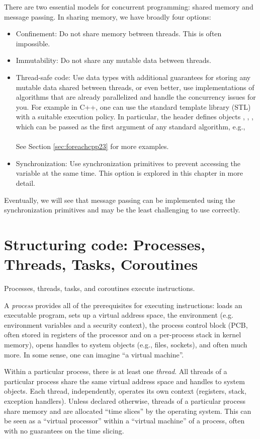 There are two essential models for concurrent programming: shared memory and message passing. In sharing memory, we have broadly four options:
\begin{itemize}
\item Confinement: Do not share memory between threads. This is often impossible.
\item Immutability: Do not share any mutable data between threads. 
\item Thread-safe code: Use data types with additional guarantees for storing any mutable data shared between threads, or even better, use implementations of algorithms that are already parallelized and handle the concurrency issues for you. For example in C++, one can use the standard template library (STL) with a suitable execution policy. In particular, the header  defines objects , , , which can be passed as the first argument of any standard algorithm, e.g., \\
\\
See Section \ref{sec:foreachcpp23} for more examples.
\item Synchronization: Use synchronization primitives to prevent accessing the variable at the same time. This option is explored in this chapter in more detail. 
\end{itemize}
Eventually, we will see that message passing can be implemented using the synchronization primitives and may be the least challenging to use correctly. 

\section{Structuring code: Processes, Threads, Tasks, Coroutines}

Processes, threads, tasks, and coroutines execute instructions. 

A \emph{process} provides all of the prerequisites for executing instructions: loads an executable program, sets up a virtual address space, the environment (e.g. environment variables and a security context), the process control block (PCB, often stored in registers of the processor and on a per-process stack in kernel memory), opens handles to system objects (e.g., files, sockets), and often much more. In some sense, one can imagine ``a virtual machine''.

Within a particular process, there is at least one \emph{thread}. All threads of a particular process share the same virtual address space and handles to system objects. Each thread, independently, operates its own context (registers, stack, exception handlers). Unless declared otherwise, threads of a particular process share memory and are allocated ``time slices'' by the operating system. This can be seen as a ``virtual processor'' within a ``virtual machine'' of a process, often with no guarantees on the time slicing.

